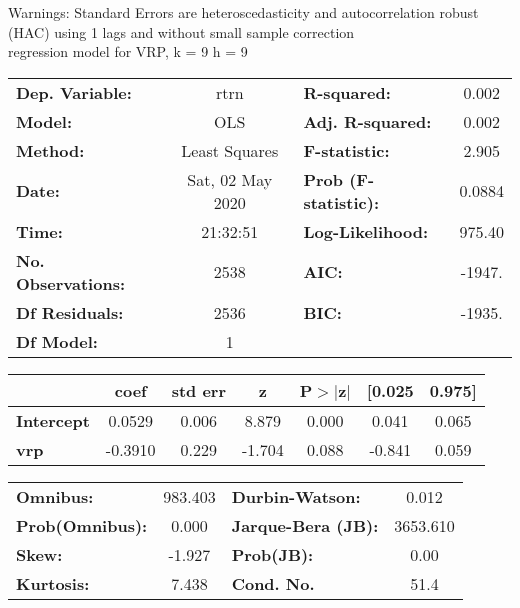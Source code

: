 Warnings: \newline
 [1] Standard Errors are heteroscedasticity and autocorrelation robust (HAC) using 1 lags and without small sample correction\\ 

regression model for VRP, k = 9 h = 9\begin{center}
\begin{tabular}{lclc}
\toprule
\textbf{Dep. Variable:}    &       rtrn       & \textbf{  R-squared:         } &     0.002   \\
\textbf{Model:}            &       OLS        & \textbf{  Adj. R-squared:    } &     0.002   \\
\textbf{Method:}           &  Least Squares   & \textbf{  F-statistic:       } &     2.905   \\
\textbf{Date:}             & Sat, 02 May 2020 & \textbf{  Prob (F-statistic):} &   0.0884    \\
\textbf{Time:}             &     21:32:51     & \textbf{  Log-Likelihood:    } &    975.40   \\
\textbf{No. Observations:} &        2538      & \textbf{  AIC:               } &    -1947.   \\
\textbf{Df Residuals:}     &        2536      & \textbf{  BIC:               } &    -1935.   \\
\textbf{Df Model:}         &           1      & \textbf{                     } &             \\
\bottomrule
\end{tabular}
\begin{tabular}{lcccccc}
                   & \textbf{coef} & \textbf{std err} & \textbf{z} & \textbf{P$> |$z$|$} & \textbf{[0.025} & \textbf{0.975]}  \\
\midrule
\textbf{Intercept} &       0.0529  &        0.006     &     8.879  &         0.000        &        0.041    &        0.065     \\
\textbf{vrp}       &      -0.3910  &        0.229     &    -1.704  &         0.088        &       -0.841    &        0.059     \\
\bottomrule
\end{tabular}
\begin{tabular}{lclc}
\textbf{Omnibus:}       & 983.403 & \textbf{  Durbin-Watson:     } &    0.012  \\
\textbf{Prob(Omnibus):} &   0.000 & \textbf{  Jarque-Bera (JB):  } & 3653.610  \\
\textbf{Skew:}          &  -1.927 & \textbf{  Prob(JB):          } &     0.00  \\
\textbf{Kurtosis:}      &   7.438 & \textbf{  Cond. No.          } &     51.4  \\
\bottomrule
\end{tabular}
\end{center}

